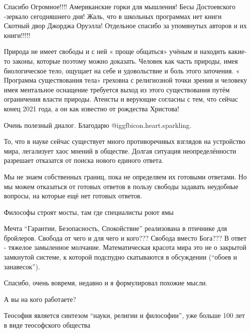\begin{multicols}{2}

Спасибо Огромное!!!! Американские горки для мышления! Бесы Достоевского
-зеркало сегодняшнего дня! Жаль, что в школьных программах нет книги Скотный
двор Джорджа Оруэлла! Отдельное спасибо за  упомянутых авторов и их книги!!!!!


Природа не имеет свободы и с ней « проще общаться» учёным и находить какие- то
законы, которые поэтому можно доказать. Человек как часть природы, имея
биологическое тело, ощущает на себе и удовольствие и боль этого заточения. «
Программа существования тела» греховна с религиозной точки зрения и человеку
имея ментальное оснащение требуется выход из этого существования путём
ограничения власти природы. Атеисты и верующие согласны с тем, что сейчас конец
2021 года, а он как известно от рождества Христова!

Очень полезный диалог. Благодарю  @igg{fbicon.heart.sparkling}.


То, что в науке сейчас существует много противоречивых взглядов на устройство
мира, легализует хаос мнений в обществе. Долгая ситуация неопределённости
разрешает отказатся от поиска нового единого ответа.

Мы не знаем собственных границ, пока не определяем их готовыми ответами. Но мы
можем отказаться от готовых ответов в пользу свободы задавать неудобные
вопросы, на которые ещё нет готовых ответов.

Философы строят мосты, там где специалисты роют ямы


Мечта \enquote{Гарантии, Безопасность, Спокойствие}  реализована в птичнике для
бройлеров.  Свобода от чего и для чего и кого???  Свобода вместо Бога??? В
ответ - тяжелое замыленное молчание. Математическая красота мира это не о
закрытой замкнутой системе, к которой подспудно скатываются в обсуждении
(\enquote{обоев и занавесок}).

Спасибо, очень вовремя, недавно и я формулировал похожие мысли.

\begin{itemize} %
А вы на кого работаете?
\end{itemize} %


Теософия является синтезом \enquote{науки, религии и философии}, уже больше 100
лет в виде теософского общества


\end{multicols}
